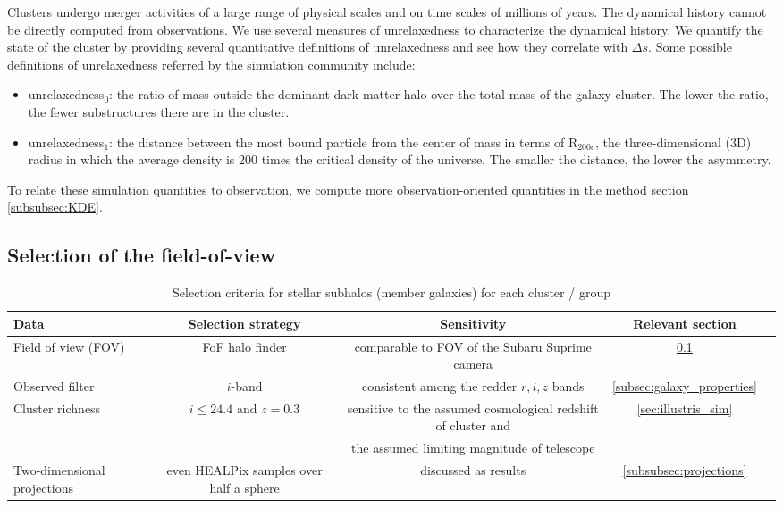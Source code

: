 Clusters undergo merger activities of a large range of physical scales and 
on time scales of millions of years. 
The dynamical history cannot be directly 
computed from observations. We use several measures of unrelaxedness to characterize 
the dynamical history.
We quantify the state of the cluster by providing several quantitative
definitions of unrelaxedness and see how they correlate with $\Delta s$.
Some possible definitions of unrelaxedness referred by the simulation community
include:
\begin{itemize}
	\item unrelaxedness$_0$: the ratio of mass outside the dominant dark matter halo over the total mass
		of the galaxy cluster. The lower the ratio, the fewer substructures there
		are in the cluster. 
	\item unrelaxedness$_1$: the distance between the most bound particle from
		the center of mass in terms of R$_{200c}$, the three-dimensional (3D) radius in which the
		average density is 200 times the critical density of the universe. 
		The smaller the distance, the lower the asymmetry. 
\end{itemize}
To relate these simulation quantities to observation, 
we compute more observation-oriented 
quantities in the method section \ref{subsubsec:KDE}. 

\subsection{Selection of the field-of-view}
\label{sec:FOV}

\begin{table*}
\begin{center}
	\caption{ Selection criteria for stellar subhalos (member galaxies) for each
		cluster / group 
\label{tab:member_galaxy_selections}} 

	\begin{tabular}{@{}lcccc@{}}
\hline 
Data &  Selection strategy  & Sensitivity & Relevant section  \\ \hline
Field of view (FOV) & FoF halo finder& comparable to FOV of the Subaru
Suprime camera & \ref{sec:FOV}  \\ 
Observed filter & $i$-band & consistent among the redder $r, i, z$ bands &   
\ref{subsec:galaxy_properties}
\\ 
Cluster richness  & $i \leq 24.4$ and $z = 0.3$  & sensitive to
the assumed cosmological redshift of cluster and & \ref{sec:illustris_sim} \\ 
& & the assumed limiting magnitude of telescope &   \\
Two-dimensional projections & even HEALPix samples over half a sphere &
discussed as results  & \ref{subsubsec:projections}\\  
\hline
\end{tabular} 

\end{center} 
\end{table*}

